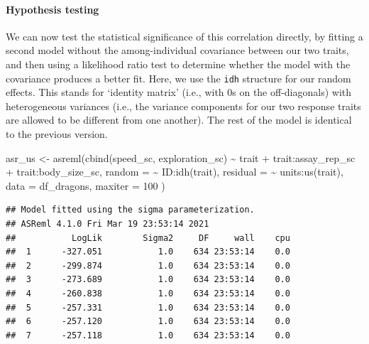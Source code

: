 \documentclass[
  12pt,
]{book}
\newenvironment{Shaded}{\begin{snugshade}}{\end{snugshade}}
\newcommand{\AttributeTok}[1]{\textcolor[rgb]{0.77,0.63,0.00}{#1}}
\newcommand{\DecValTok}[1]{\textcolor[rgb]{0.00,0.00,0.81}{#1}}
\newcommand{\FunctionTok}[1]{\textcolor[rgb]{0.00,0.00,0.00}{#1}}
\newcommand{\NormalTok}[1]{#1}
\newcommand{\OtherTok}[1]{\textcolor[rgb]{0.56,0.35,0.01}{#1}}
\newcommand{\SpecialCharTok}[1]{\textcolor[rgb]{0.00,0.00,0.00}{#1}}
\begin{document}
\hypertarget{hypothesis-testing}{%
\paragraph{Hypothesis testing}\label{hypothesis-testing}}

We can now test the statistical significance of this correlation directly, by fitting a second model without the among-individual covariance between our two traits, and then using a likelihood ratio test to determine whether the model with the covariance produces a better fit.
Here, we use the \texttt{idh} structure for our random effects. This stands for `identity matrix' (i.e., with 0s on the off-diagonals) with heterogeneous variances (i.e., the variance components for our two response traits are allowed to be different from one another).
The rest of the model is identical to the previous version.

\begin{Shaded}
\begin{Highlighting}[]
\NormalTok{asr\_us }\OtherTok{\textless{}{-}} \FunctionTok{asreml}\NormalTok{(}\FunctionTok{cbind}\NormalTok{(speed\_sc, exploration\_sc) }\SpecialCharTok{\textasciitilde{}}\NormalTok{ trait }\SpecialCharTok{+}
\NormalTok{  trait}\SpecialCharTok{:}\NormalTok{assay\_rep\_sc }\SpecialCharTok{+}\NormalTok{ trait}\SpecialCharTok{:}\NormalTok{body\_size\_sc,}
\AttributeTok{random =} \SpecialCharTok{\textasciitilde{}}\NormalTok{ ID}\SpecialCharTok{:}\FunctionTok{idh}\NormalTok{(trait),}
\AttributeTok{residual =} \SpecialCharTok{\textasciitilde{}}\NormalTok{ units}\SpecialCharTok{:}\FunctionTok{us}\NormalTok{(trait),}
\AttributeTok{data =}\NormalTok{ df\_dragons,}
\AttributeTok{maxiter =} \DecValTok{100}
\NormalTok{)}
\end{Highlighting}
\end{Shaded}

\begin{verbatim}
## Model fitted using the sigma parameterization.
## ASReml 4.1.0 Fri Mar 19 23:53:14 2021
##           LogLik        Sigma2     DF     wall    cpu
##  1      -327.051           1.0    634 23:53:14    0.0
##  2      -299.874           1.0    634 23:53:14    0.0
##  3      -273.689           1.0    634 23:53:14    0.0
##  4      -260.838           1.0    634 23:53:14    0.0
##  5      -257.331           1.0    634 23:53:14    0.0
##  6      -257.120           1.0    634 23:53:14    0.0
##  7      -257.118           1.0    634 23:53:14    0.0
\end{verbatim}
\end{document}
